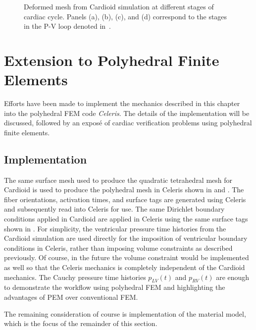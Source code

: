 \begin{figure}
{\label{fig:snaps4}}		
%
\caption{Deformed mesh from Cardioid simulation at different stages of cardiac cycle. Panels (a), (b), (c), and (d) correspond to the stages in the P-V loop denoted in~.}
\label{fig:snaps}
\end{figure}

\section{Extension to Polyhedral Finite Elements}
\label{Polyhedral Finite Elements}

Efforts have been made to implement the mechanics described in this chapter into the polyhedral FEM code \textit{Celeris}. The details of the implementation will be discussed, followed by an expos\'{e} of cardiac verification problems using polyhedral finite elements.

\subsection{Implementation}

The same surface mesh used to produce the quadratic tetrahedral mesh for Cardioid is used to produce the polyhedral mesh in Celeris shown in  and . The fiber orientations, activation times, and surface tags are generated using Celeris and subsequently read into Celeris for use. The same Dirichlet boundary conditions applied in Cardioid are applied in Celeris using the same surface tags shown in . For simplicity, the ventricular pressure time histories from the Cardioid simulation are used directly for the imposition of ventricular boundary conditions in Celeris, rather than imposing volume constraints as described previously. Of course, in the future the volume constraint would be implemented as well so that the Celeris mechanics is completely independent of the Cardioid mechanics. The Cauchy pressure time histories $p_{LV}(t)$ and $p_{RV}(t)$ are enough to demonstrate the workflow using polyhedral FEM and highlighting the advantages of PEM over conventional FEM.

The remaining consideration of course is implementation of the material model, which is the focus of the remainder of this section.

